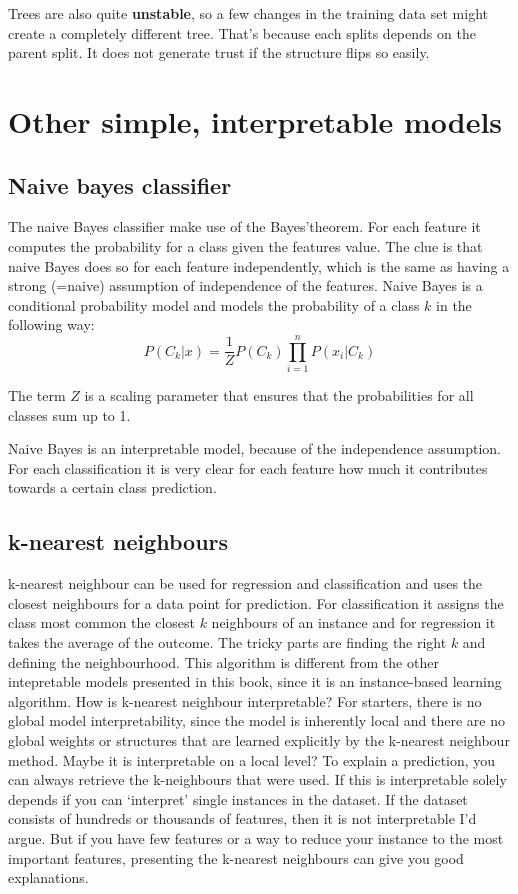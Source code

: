 \documentclass[12pt,]{krantz}
\theoremstyle{definition}
\theoremstyle{definition}
\theoremstyle{definition}
\theoremstyle{remark}
\begin{document}
Trees are also quite \textbf{unstable}, so a few changes in the training
data set might create a completely different tree. That's because each
splits depends on the parent split. It does not generate trust if the
structure flips so easily.

\section{Other simple, interpretable
models}\label{other-simple-interpretable-models}

\subsection{Naive bayes classifier}\label{naive-bayes-classifier}

The naive Bayes classifier make use of the Bayes'theorem. For each
feature it computes the probability for a class given the features
value. The clue is that naive Bayes does so for each feature
independently, which is the same as having a strong (=naive) assumption
of independence of the features. Naive Bayes is a conditional
probability model and models the probability of a class \(k\) in the
following way:
\[ P(C_k|x) = \frac{1}{Z} P(C_k) \prod_{i=1}^n P(x_i | C_k)\]

The term \(Z\) is a scaling parameter that ensures that the
probabilities for all classes sum up to 1.

Naive Bayes is an interpretable model, because of the independence
assumption. For each classification it is very clear for each feature
how much it contributes towards a certain class prediction.

\subsection{k-nearest neighbours}\label{k-nearest-neighbours}

k-nearest neighbour can be used for regression and classification and
uses the closest neighbours for a data point for prediction. For
classification it assigns the class most common the closest \(k\)
neighbours of an instance and for regression it takes the average of the
outcome. The tricky parts are finding the right \(k\) and defining the
neighbourhood. This algorithm is different from the other intepretable
models presented in this book, since it is an instance-based learning
algorithm. How is k-nearest neighbour interpretable? For starters, there
is no global model interpretability, since the model is inherently local
and there are no global weights or structures that are learned
explicitly by the k-nearest neighbour method. Maybe it is interpretable
on a local level? To explain a prediction, you can always retrieve the
k-neighbours that were used. If this is interpretable solely depends if
you can `interpret' single instances in the dataset. If the dataset
consists of hundreds or thousands of features, then it is not
interpretable I'd argue. But if you have few features or a way to reduce
your instance to the most important features, presenting the k-nearest
neighbours can give you good explanations.
\end{document}
